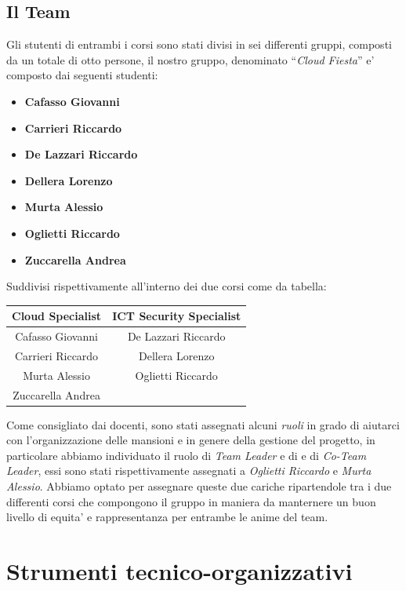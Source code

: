 \documentclass[a4paper]{report}
\newcommand{\quotes}[1]{``#1''}
\begin{document}
	\section{Il Team}\label{il_team}
		Gli stutenti di entrambi i corsi sono stati divisi in sei differenti gruppi, composti da un totale di otto
		persone, il nostro gruppo, denominato \quotes{\emph{Cloud Fiesta}} e' composto dai seguenti studenti:
		\begin{itemize}
			\item \textbf{Cafasso Giovanni}
			\item \textbf{Carrieri Riccardo}
			\item \textbf{De Lazzari Riccardo}
			\item \textbf{Dellera Lorenzo}
			\item \textbf{Murta Alessio}
			\item \textbf{Oglietti Riccardo}
			\item \textbf{Zuccarella Andrea}
		\end{itemize}
		Suddivisi rispettivamente all'interno dei due corsi come da tabella:
		\begin{center}
			\begin{tabular}{c c}
				Cloud Specialist & ICT Security Specialist \\
				\midrule
				Cafasso Giovanni & De Lazzari Riccardo \\
				Carrieri Riccardo & Dellera Lorenzo \\
				Murta Alessio & Oglietti Riccardo \\
				Zuccarella Andrea & \\
			\end{tabular}
		\end{center}
		Come consigliato dai docenti, sono stati assegnati alcuni \emph{ruoli} in grado di aiutarci con l'organizzazione
		delle mansioni e in genere della gestione del progetto, in particolare abbiamo individuato il ruolo di
		\emph{Team Leader} e di e di \emph{Co-Team Leader}, essi sono stati rispettivamente assegnati a \emph{Oglietti
		Riccardo} e \emph{Murta Alessio}. Abbiamo optato per assegnare queste due cariche ripartendole tra i due
		differenti corsi che compongono il gruppo in maniera da manternere un buon livello di equita' e rappresentanza
		per entrambe le anime del team.

\chapter{Strumenti tecnico-organizzativi}
\end{document}
